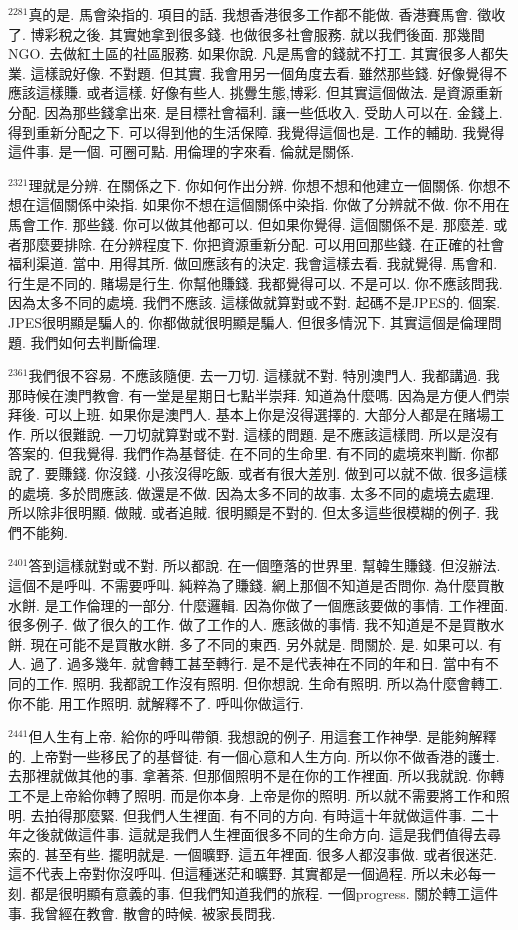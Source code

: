\documentclass{book}
\begin{document}
$^{2281}$真的是.
馬會染指的.
項目的話.
我想香港很多工作都不能做.
香港賽馬會.
徵收了.
博彩稅之後.
其實她拿到很多錢.
也做很多社會服務.
就以我們後面.
那幾間NGO.
去做紅土區的社區服務.
如果你說.
凡是馬會的錢就不打工.
其實很多人都失業.
這樣說好像.
不對題.
但其實.
我會用另一個角度去看.
雖然那些錢.
好像覺得不應該這樣賺.
或者這樣.
好像有些人.
挑釁生態,博彩.
但其實這個做法.
是資源重新分配.
因為那些錢拿出來.
是目標社會福利.
讓一些低收入.
受助人可以在.
金錢上.
得到重新分配之下.
可以得到他的生活保障.
我覺得這個也是.
工作的輔助.
我覺得這件事.
是一個.
可圈可點.
用倫理的字來看.
倫就是關係.

$^{2321}$理就是分辨.
在關係之下.
你如何作出分辨.
你想不想和他建立一個關係.
你想不想在這個關係中染指.
如果你不想在這個關係中染指.
你做了分辨就不做.
你不用在馬會工作.
那些錢.
你可以做其他都可以.
但如果你覺得.
這個關係不是.
那麼差.
或者那麼要排除.
在分辨程度下.
你把資源重新分配.
可以用回那些錢.
在正確的社會福利渠道.
當中.
用得其所.
做回應該有的決定.
我會這樣去看.
我就覺得.
馬會和.
行生是不同的.
賭場是行生.
你幫他賺錢.
我都覺得可以.
不是可以.
你不應該問我.
因為太多不同的處境.
我們不應該.
這樣做就算對或不對.
起碼不是JPES的.
個案.
JPES很明顯是騙人的.
你都做就很明顯是騙人.
但很多情況下.
其實這個是倫理問題.
我們如何去判斷倫理.

$^{2361}$我們很不容易.
不應該隨便.
去一刀切.
這樣就不對.
特別澳門人.
我都講過.
我那時候在澳門教會.
有一堂是星期日七點半崇拜.
知道為什麼嗎.
因為是方便人們崇拜後.
可以上班.
如果你是澳門人.
基本上你是沒得選擇的.
大部分人都是在賭場工作.
所以很難說.
一刀切就算對或不對.
這樣的問題.
是不應該這樣問.
所以是沒有答案的.
但我覺得.
我們作為基督徒.
在不同的生命里.
有不同的處境來判斷.
你都說了.
要賺錢.
你沒錢.
小孩沒得吃飯.
或者有很大差別.
做到可以就不做.
很多這樣的處境.
多於問應該.
做還是不做.
因為太多不同的故事.
太多不同的處境去處理.
所以除非很明顯.
做賊.
或者追賊.
很明顯是不對的.
但太多這些很模糊的例子.
我們不能夠.

$^{2401}$答到這樣就對或不對.
所以都說.
在一個墮落的世界里.
幫韓生賺錢.
但沒辦法.
這個不是呼叫.
不需要呼叫.
純粹為了賺錢.
網上那個不知道是否問你.
為什麼買散水餅.
是工作倫理的一部分.
什麼邏輯.
因為你做了一個應該要做的事情.
工作裡面.
很多例子.
做了很久的工作.
做了工作的人.
應該做的事情.
我不知道是不是買散水餅.
現在可能不是買散水餅.
多了不同的東西.
另外就是.
問關於.
是.
如果可以.
有人.
過了.
過多幾年.
就會轉工甚至轉行.
是不是代表神在不同的年和日.
當中有不同的工作.
照明.
我都說工作沒有照明.
但你想說.
生命有照明.
所以為什麼會轉工.
你不能.
用工作照明.
就解釋不了.
呼叫你做這行.

$^{2441}$但人生有上帝.
給你的呼叫帶領.
我想說的例子.
用這套工作神學.
是能夠解釋的.
上帝對一些移民了的基督徒.
有一個心意和人生方向.
所以你不做香港的護士.
去那裡就做其他的事.
拿著茶.
但那個照明不是在你的工作裡面.
所以我就說.
你轉工不是上帝給你轉了照明.
而是你本身.
上帝是你的照明.
所以就不需要將工作和照明.
去拍得那麼緊.
但我們人生裡面.
有不同的方向.
有時這十年就做這件事.
二十年之後就做這件事.
這就是我們人生裡面很多不同的生命方向.
這是我們值得去尋索的.
甚至有些.
擺明就是.
一個曠野.
這五年裡面.
很多人都沒事做.
或者很迷茫.
這不代表上帝對你沒呼叫.
但這種迷茫和曠野.
其實都是一個過程.
所以未必每一刻.
都是很明顯有意義的事.
但我們知道我們的旅程.
一個progress.
關於轉工這件事.
我曾經在教會.
散會的時候.
被家長問我.
\end{document}
